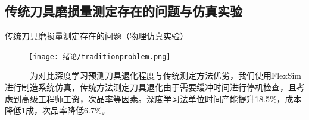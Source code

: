 \subsection{传统刀具磨损量测定存在的问题与仿真实验}
\begin{frame}{传统刀具磨损量测定存在的问题（物理仿真实验）}
\begin{figure}[htp]
    \centering
    \texttt{[image: 绪论/traditionproblem.png]}
\end{figure}
\ \ \ \ \ \ 为对比深度学习预测刀具退化程度与传统测定方法优劣，我们使用FlexSim进行制造系统仿真，传统方法测定刀具退化由于需要缓冲时间进行停机检查，且考虑到高级工程师工资，次品率等因素。深度学习法单位时间产能提升18.5\%，成本降低1成，次品率降低6.7\%。\par
\end{frame} 
% 
